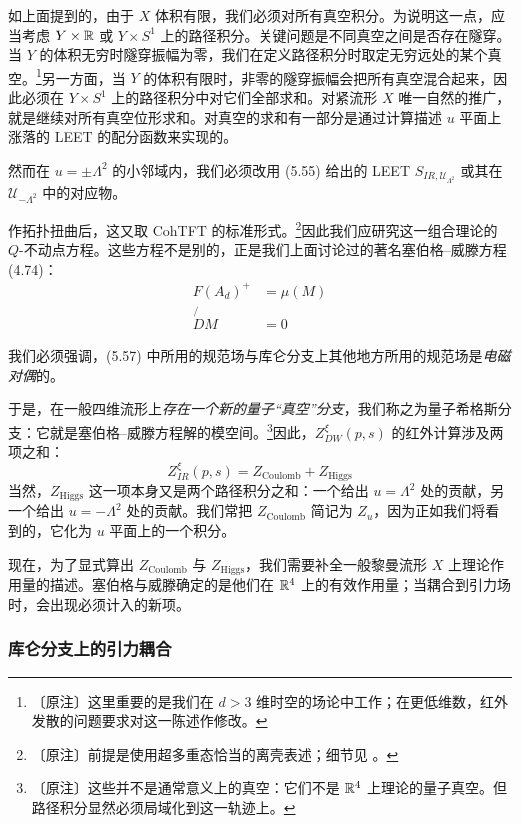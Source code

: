如上面提到的，由于 $X$ 体积有限，我们必须对所有真空积分。为说明这一点，应当考虑 $Y\times\mathbb{R}$ 或 $Y\times S^{1}$ 上的路径积分。关键问题是不同真空之间是否存在隧穿。当 $Y$ 的体积无穷时隧穿振幅为零，我们在定义路径积分时取定无穷远处的某个真空。\footnote{〔原注〕这里重要的是我们在 $d>3$ 维时空的场论中工作；在更低维数，红外发散的问题要求对这一陈述作修改。}另一方面，当 $Y$ 的体积有限时，非零的隧穿振幅会把所有真空混合起来，因此必须在 $Y\times S^{1}$ 上的路径积分中对它们全部求和。对紧流形 $X$ 唯一自然的推广，就是继续对所有真空位形求和。对真空的求和有一部分是通过计算描述 $u$ 平面上涨落的 LEET 的配分函数来实现的。

然而在 $u=\pm\Lambda^{2}$ 的小邻域内，我们必须改用 (5.55) 给出的 LEET $S_{IR,\mathcal{U}_{\Lambda^{2}}}$ 或其在 $\mathcal{U}_{-\Lambda^{2}}$ 中的对应物。

作拓扑扭曲后，这又取 CohTFT 的标准形式。\footnote{〔原注〕前提是使用超多重态恰当的离壳表述；细节见 \cite{ref24}。}因此我们应研究这一组合理论的 $Q$-不动点方程。这些方程不是别的，正是我们上面讨论过的著名塞伯格--威滕方程 (4.74)：
\begin{equation}
\begin{aligned}
F(A_{d})^{+}&=\mu(M)\\
\not{D}M&=0
\end{aligned}
\tag{5.57}
\end{equation}

我们必须强调，(5.57) 中所用的规范场与库仑分支上其他地方所用的规范场是\emph{电磁对偶}的。

于是，在一般四维流形上\emph{存在一个新的量子“真空”分支}，我们称之为量子希格斯分支：它就是塞伯格--威滕方程解的模空间。\footnote{〔原注〕这些并不是通常意义上的真空：它们不是 $\mathbb{R}^{4}$ 上理论的量子真空。但路径积分显然必须局域化到这一轨迹上。}因此，$Z^{\xi}_{DW}(p,s)$ 的红外计算涉及两项之和：
\begin{equation}
\boxed{Z^{\xi}_{IR}(p,s)=Z_{\text{Coulomb}}+Z_{\text{Higgs}}}
\tag{5.58}
\end{equation}
当然，$Z_{\text{Higgs}}$ 这一项本身又是两个路径积分之和：一个给出 $u=\Lambda^{2}$ 处的贡献，另一个给出 $u=-\Lambda^{2}$ 处的贡献。我们常把 $Z_{\text{Coulomb}}$ 简记为 $Z_{u}$，因为正如我们将看到的，它化为 $u$ 平面上的一个积分。

现在，为了显式算出 $Z_{\text{Coulomb}}$ 与 $Z_{\text{Higgs}}$，我们需要补全一般黎曼流形 $X$ 上理论作用量的描述。塞伯格与威滕确定的是他们在 $\mathbb{R}^{4}$ 上的有效作用量；当耦合到引力场时，会出现必须计入的新项。

\subsubsection{库仑分支上的引力耦合}

